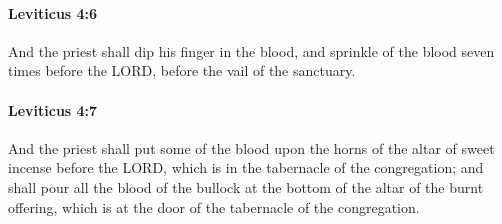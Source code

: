 		\paragraph{Leviticus 4:6} %
			\label{LEVITICUS-4-6}

			And the priest shall dip his finger in the blood, and sprinkle of the blood seven times before the LORD, before the vail of the sanctuary.


		\paragraph{Leviticus 4:7} %
			\label{LEVITICUS-4-7}

			And the priest shall put some of the blood upon the horns of the altar of sweet incense before the LORD, which is in the tabernacle of the congregation; and shall pour all the blood of the bullock at the bottom of the altar of the burnt offering, which is at the door of the tabernacle of the congregation.

